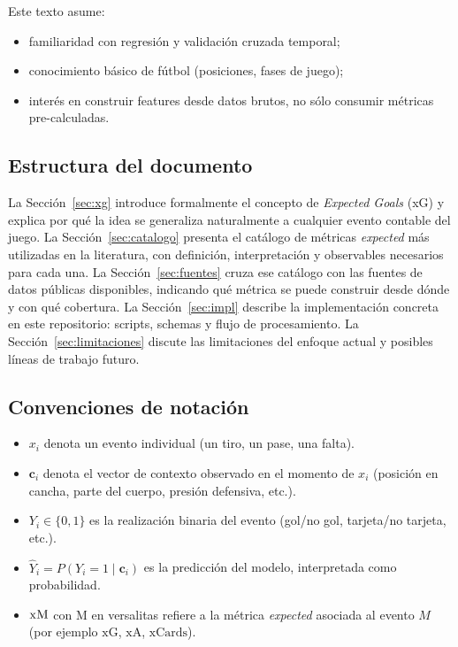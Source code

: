 Este texto asume:

\begin{itemize}[noitemsep]
  \item familiaridad con regresión y validación cruzada temporal;
  \item conocimiento básico de fútbol (posiciones, fases de juego);
  \item interés en construir features desde datos brutos, no sólo consumir métricas pre-calculadas.
\end{itemize}

\subsection{Estructura del documento}

La Sección~\ref{sec:xg} introduce formalmente el concepto de \emph{Expected Goals} (xG) y explica por qué la idea se generaliza naturalmente a cualquier evento contable del juego. La Sección~\ref{sec:catalogo} presenta el catálogo de métricas \emph{expected} más utilizadas en la literatura, con definición, interpretación y observables necesarios para cada una. La Sección~\ref{sec:fuentes} cruza ese catálogo con las fuentes de datos públicas disponibles, indicando qué métrica se puede construir desde dónde y con qué cobertura. La Sección~\ref{sec:impl} describe la implementación concreta en este repositorio: scripts, schemas y flujo de procesamiento. La Sección~\ref{sec:limitaciones} discute las limitaciones del enfoque actual y posibles líneas de trabajo futuro.

\subsection{Convenciones de notación}

\begin{itemize}[noitemsep]
  \item $x_i$ denota un evento individual (un tiro, un pase, una falta).
  \item $\mathbf{c}_i$ denota el vector de contexto observado en el momento de $x_i$ (posición en cancha, parte del cuerpo, presión defensiva, etc.).
  \item $Y_i \in \{0,1\}$ es la realización binaria del evento (gol/no gol, tarjeta/no tarjeta, etc.).
  \item $\widehat{Y}_i = P(Y_i = 1 \mid \mathbf{c}_i)$ es la predicción del modelo, interpretada como probabilidad.
  \item $\mathrm{x}\textsc{M}$ con \textsc{M} en versalitas refiere a la métrica \emph{expected} asociada al evento $M$ (por ejemplo $\mathrm{xG}$, $\mathrm{xA}$, $\mathrm{xCards}$).
\end{itemize}
